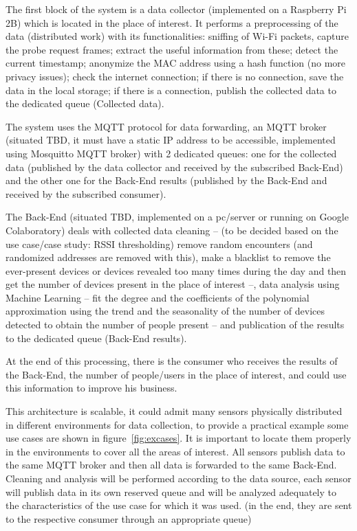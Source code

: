 The first block of the system is a data collector (implemented on a Raspberry Pi 2B) which is located in the place of interest. It performs a preprocessing of the data (distributed work) with its functionalities: sniffing of Wi-Fi packets, capture the probe request frames; extract the useful information from these; detect the current timestamp; anonymize the MAC address using a hash function (no more privacy issues); check the internet connection; if there is no connection, save the data in the local storage; if there is a connection, publish the collected data to the dedicated queue (Collected data).

The system uses the MQTT protocol for data forwarding, an MQTT broker (situated TBD, it must have a static IP address to be accessible, implemented using Mosquitto MQTT broker) with 2 dedicated queues: one for the collected data (published by the data collector and received by the subscribed Back-End) and the other one for the Back-End results (published by the Back-End and received by the subscribed consumer).

The Back-End (situated TBD, implemented on a pc/server or running on Google Colaboratory) deals with collected data cleaning -- (to be decided based on the use case/case study: RSSI thresholding) remove random encounters (and randomized addresses are removed with this), make a blacklist to remove the ever-present devices or devices revealed too many times during the day and then get the number of devices present in the place of interest --, data analysis using Machine Learning -- fit the degree and the coefficients of the polynomial approximation using the trend and the seasonality of the number of devices detected to obtain the number of people present -- and publication of the results to the dedicated queue (Back-End results).

At the end of this processing, there is the consumer who receives the results of the Back-End, the number of people/users in the place of interest, and could use this information to improve his business.

This architecture is scalable, it could admit many sensors physically distributed in different environments for data collection, to provide a practical example some use cases are shown in figure~\ref{fig:excases}. It is important to locate them properly in the environments to cover all the areas of interest. All sensors publish data to the same MQTT broker and then all data is forwarded to the same Back-End. Cleaning and analysis will be performed according to the data source, each sensor will publish data in its own reserved queue and will be analyzed adequately to the characteristics of the use case for which it was used. (in the end, they are sent to the respective consumer through an appropriate queue)

